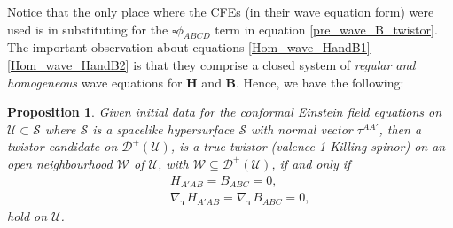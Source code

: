 \documentclass[10pt,a4paper]{article}
\theoremstyle{plain}
\newtheorem{proposition}{Proposition}
\def\bmB{{\bm B}}
\def\bmH{{\bm H}}
\newcounter{mnotecount}%
\newcommand{\mnotex}[1]%
{\protect{\stepcounter{mnotecount}}$^{\mbox{\footnotesize $\bullet$\themnotecount}}$ 
\marginpar{%
\raggedright\tiny\em
$\!\!\!\!\!\!\,\bullet$\themnotecount: #1} }
\begin{document}
Notice that the only place where the CFEs (in their wave equation
form) were used is in substituting for the $\square \phi _{ABCD}$ term
in equation \eqref{pre_wave_B_twistor}.  \\

The important observation about equations
\eqref{Hom_wave_HandB1}--\eqref{Hom_wave_HandB2} is that they comprise
a closed system of \emph{regular and homogeneous} wave equations for
$\bmH$ and $\bmB$. Hence, we have the following:
\begin{proposition}\label{Prop:Propagation_twistor}
  Given initial data for the conformal Einstein field equations on
  $\mathcal{U}\subset\mathcal{S}$ where $\mathcal{S}$ is a spacelike
  hypersurface $\mathcal{S}$ with normal vector $\tau^{AA'}$, then a
  twistor candidate on $\mathcal{D}^{+}(\mathcal{U})$, is a true
  twistor (valence-1 Killing spinor) on an open neighbourhood
  $\mathcal{W}$ of $\mathcal{U}$, with
  $\mathcal{W}\subseteq\mathcal{D}^{+}(\mathcal{U})$, if and only if
\begin{subequations}
\begin{eqnarray}
  &&
  H_{A'AB}=B_{ABC}=0,\label{eq:VanishingOfH_twistor}\\ &&\nabla_{\bm\tau}H_{A'AB}=\nabla_{\bm\tau}
  B_{ABC}=0, \label{eq:VanishingOfNormalDerivB_twistor}
\end{eqnarray}
\end{subequations}
hold on $\mathcal{U}$.
\end{proposition}
\end{document}
